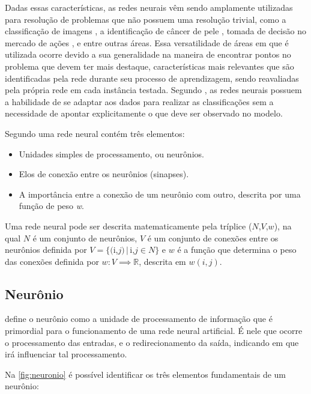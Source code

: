 \par Dadas essas características, as redes neurais vêm sendo amplamente utilizadas para resolução de problemas que não possuem uma resolução trivial, como a classificação de imagens \cite{imaginetArticle}, a identificação de câncer de pele \cite{esteva2017dermatologist}, tomada de decisão no mercado de ações \cite{gambogi2013aplicaccao}, e entre outras áreas. Essa versatilidade de áreas em que é utilizada ocorre devido a sua generalidade na maneira de encontrar pontos no problema que devem ter mais destaque, características mais relevantes que são identificadas pela rede durante seu processo de aprendizagem, sendo reavaliadas pela própria rede em cada instância testada. Segundo , as redes neurais possuem a habilidade de se adaptar aos dados para realizar as classificações sem a necessidade de apontar explicitamente o que deve ser observado no modelo.
\par Segundo  uma rede neural contém três elementos:
\begin{itemize}
\item Unidades simples de processamento, ou neurônios.
\item Elos de conexão entre os neurônios (sinapses).
\item A importância entre a conexão de um neurônio com outro, descrita por uma função de peso \textit{w}.
\end{itemize}
\par Uma rede neural pode ser descrita matematicamente pela tríplice ($N$,$V$,$w$), na qual $N$ é um conjunto de neurônios, $V$ é um conjunto de conexões entre os neurônios definida por $V = \{($i,$j) \,|\, $i,$j \in N \}$ e $w$ é a função que determina o peso das conexões definida por $w: V \implies \mathbb{R}$, descrita em $w(i,j)$.
\subsection{Neurônio}
 define o neurônio como a unidade de processamento de informação que é primordial para o funcionamento de uma rede neural artificial. É nele que ocorre o processamento das entradas, e o redirecionamento da saída, indicando em que irá influenciar tal processamento.
\par Na \autoref{fig:neuronio} é possível identificar os três elementos fundamentais de um neurônio:

